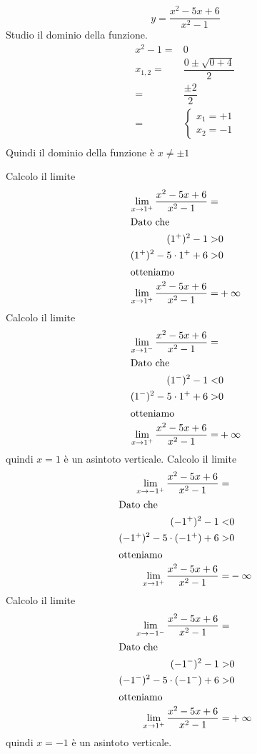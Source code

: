 \begin{exercise}
\[y=\dfrac{x^2-5x+6}{x^2-1}\]
	\tcblower
Studio il dominio della funzione. 
\begin{align*}
x^2-1=&0\\ 
x_{1,2}=&\dfrac{0\pm\sqrt{0+4}}{2}\\
=&\dfrac{\pm 2}{2}\\
=&\begin{cases}
x_1=+1\\
x_2=-1
\end{cases}\\
\end{align*}
Quindi il dominio della funzione è  $x\neq\pm1$

Calcolo il limite
\begin{align*}
\lim_{x\to 1^+}\frac{x^2-5x+6}{x^2-1}=&\\
\intertext{Dato che}
(1^+)^2-1>&0\\
(1^+)^2-5\cdot 1^++6>&0\\
\intertext{otteniamo}
\lim_{x\to 1^+}\frac{x^2-5x+6}{x^2-1}=&+\infty\\
\end{align*} 
Calcolo il limite
\begin{align*}
\lim_{x\to 1^-}\frac{x^2-5x+6}{x^2-1}=&\\
\intertext{Dato che}
(1^-)^2-1<&0\\
(1^-)^2-5\cdot 1^++6>&0\\
\intertext{otteniamo}
\lim_{x\to 1^+}\frac{x^2-5x+6}{x^2-1}=&+\infty\\
\end{align*} 
quindi $x=1$ è un asintoto verticale.
Calcolo il limite
\begin{align*}
\lim_{x\to -1^+}\frac{x^2-5x+6}{x^2-1}=&\\
\intertext{Dato che}
(-1^+)^2-1<&0\\
(-1^+)^2-5\cdot (-1^+)+6>&0\\
\intertext{otteniamo}
\lim_{x\to 1^+}\frac{x^2-5x+6}{x^2-1}=&-\infty\\
\end{align*} 
Calcolo il limite
\begin{align*}
\lim_{x\to -1^-}\frac{x^2-5x+6}{x^2-1}=&\\
\intertext{Dato che}
(-1^-)^2-1>&0\\
(-1^-)^2-5\cdot (-1^-)+6>&0\\
\intertext{otteniamo}
\lim_{x\to 1^+}\frac{x^2-5x+6}{x^2-1}=&+\infty\\
\end{align*} 
quindi $x=-1$ è un asintoto verticale.
\end{exercise}
